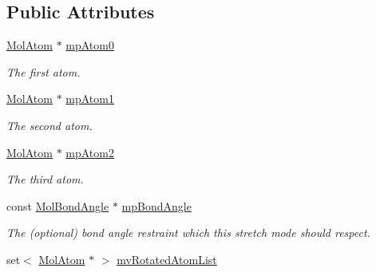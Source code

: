 \subsection*{Public Attributes}
\begin{DoxyCompactItemize}
\item 
\mbox{\label{struct_obj_cryst_1_1_stretch_mode_bond_angle_a63bc5bb54f0d298fb47b7bf86e8c2ff5}} 
\mbox{\hyperlink{class_obj_cryst_1_1_mol_atom}{Mol\+Atom}} $\ast$ \mbox{\hyperlink{struct_obj_cryst_1_1_stretch_mode_bond_angle_a63bc5bb54f0d298fb47b7bf86e8c2ff5}{mp\+Atom0}}
\begin{DoxyCompactList}\small\item\em The first atom. \end{DoxyCompactList}\item 
\mbox{\label{struct_obj_cryst_1_1_stretch_mode_bond_angle_aa5b52fcece40cd41c93eeb8b1dfec939}} 
\mbox{\hyperlink{class_obj_cryst_1_1_mol_atom}{Mol\+Atom}} $\ast$ \mbox{\hyperlink{struct_obj_cryst_1_1_stretch_mode_bond_angle_aa5b52fcece40cd41c93eeb8b1dfec939}{mp\+Atom1}}
\begin{DoxyCompactList}\small\item\em The second atom. \end{DoxyCompactList}\item 
\mbox{\label{struct_obj_cryst_1_1_stretch_mode_bond_angle_a08c6b4fde05610d0242bfd7b4a6acc3f}} 
\mbox{\hyperlink{class_obj_cryst_1_1_mol_atom}{Mol\+Atom}} $\ast$ \mbox{\hyperlink{struct_obj_cryst_1_1_stretch_mode_bond_angle_a08c6b4fde05610d0242bfd7b4a6acc3f}{mp\+Atom2}}
\begin{DoxyCompactList}\small\item\em The third atom. \end{DoxyCompactList}\item 
\mbox{\label{struct_obj_cryst_1_1_stretch_mode_bond_angle_ab173d155feb360d0b95b5cd35f346da5}} 
const \mbox{\hyperlink{class_obj_cryst_1_1_mol_bond_angle}{Mol\+Bond\+Angle}} $\ast$ \mbox{\hyperlink{struct_obj_cryst_1_1_stretch_mode_bond_angle_ab173d155feb360d0b95b5cd35f346da5}{mp\+Bond\+Angle}}
\begin{DoxyCompactList}\small\item\em The (optional) bond angle restraint which this stretch mode should respect. \end{DoxyCompactList}\item 
set$<$ \mbox{\hyperlink{class_obj_cryst_1_1_mol_atom}{Mol\+Atom}} $\ast$ $>$ \mbox{\hyperlink{struct_obj_cryst_1_1_stretch_mode_bond_angle_a1d70964f33ea3a594efd2c3a595816a6}{mv\+Rotated\+Atom\+List}}
\end{DoxyCompactItemize}


